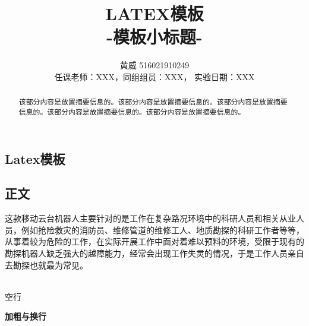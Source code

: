 \documentclass[a4paper, 11pt]{article}   %
\begin{document}
\begin{CJK}{UTF8}{gbsn}        %

\begin{spacing}{1.15} %
 \pagestyle{fancy}
 \lhead{}                         %
 \chead{}                         %
 \lfoot{}                       
 \rfoot{\thepage} 
 \renewcommand{\headrulewidth}{0.4pt}
 \renewcommand{\footrulewidth}{0.4pt}
\title{\huge LATEX模板 \\ \Large -模板小标题-}  
\author{黄威 516021910249\\  
\small 任课老师：XXX，\small 同组组员：XXX， \small 实验日期：XXX}            
\date{}   %
\maketitle                         %
\begin{abstract}
该部分内容是放置摘要信息的。该部分内容是放置摘要信息的。该部分内容是放置摘要信息的。该部分内容是放置摘要信息的。该部分内容是放置摘要信息的。
\end{abstract}

\renewcommand{\contentsname}{目录} %
\tableofcontents                  %
\newpage


\section{Latex模板}


\subsection{正文}
\label{sec:fastguide}
这款移动云台机器人主要针对的是工作在复杂路况环境中的科研人员和相关从业人员，例如抢险救灾的消防员、维修管道的维修工人、地质勘探的科研工作者等等，从事着较为危险的工作，在实际开展工作中面对着难以预料的环境，受限于现有的勘探机器人缺乏强大的越障能力，经常会出现工作失灵的情况，于是工作人员亲自去勘探也就最为常见。\par
~\\                                      %
空行\par
\textbf{加粗与换行}


\end{spacing}
\end{CJK}
\end{document}
